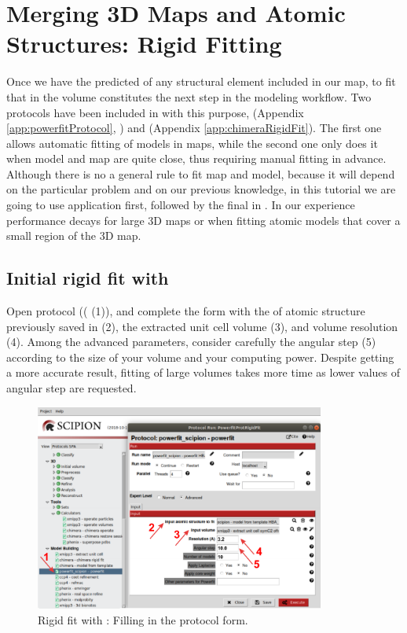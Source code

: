 \section{Merging 3D Maps and Atomic Structures: Rigid Fitting}
Once we have the predicted  of any structural element included in our map, to fit that  in the volume constitutes the next step in the modeling workflow. Two protocols have been included in \scipion with this purpose,  (Appendix \ref{app:powerfitProtocol}, \citep{vanzundert2016}) and  (Appendix \ref{app:chimeraRigidFit}). The first one allows automatic fitting of models in maps, while the second one only does it when model and map are quite close, thus requiring manual fitting in advance. Although there is no a general rule to fit map and model, because it will depend on the particular problem and on our previous knowledge, in this tutorial we are going to use \powerfit application first, followed by the final  in \chimera {}. In our experience \powerfit performance decays for large 3D maps or when fitting atomic models that cover a small region of the 3D map.

\subsection*{Initial rigid fit with \powerfit}
 Open  protocol (( (1)), and complete the form with the  of atomic structure previously saved in \chimera (2), the extracted unit cell volume (3), and volume resolution (4). Among the advanced parameters, consider carefully the angular step (5) according to the size of your volume and your computing power. Despite getting a more accurate result, fitting of large volumes takes more time as  lower values of angular step are requested.  
 
 \begin{figure}[H]
  \centering 
  \captionsetup{width=.7\linewidth} 
  \includegraphics[width=0.85\textwidth]{Images/Fig18}
  \caption{Rigid fit with \powerfit: Filling in the protocol form.}
  \label{fig:powerfit_protocol}
  \end{figure}
 
